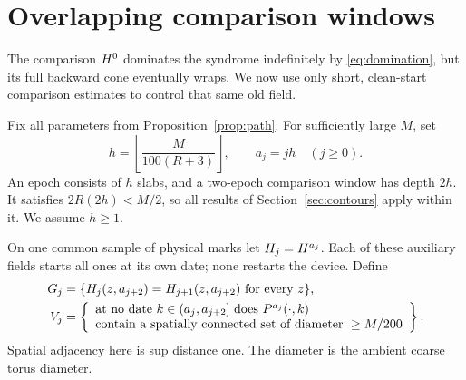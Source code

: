 \section{Overlapping comparison windows}\label{sec:windows}

The comparison \(H^0\) dominates the syndrome indefinitely by
\eqref{eq:domination}, but its full backward cone eventually wraps.
We now use only short, clean-start comparison estimates to control
that same old field.

Fix all parameters from Proposition~\ref{prop:path}. For sufficiently
large \(M\), set
\begin{equation}\label{eq:epoch}
 h=\left\lfloor\frac{M}{100(R+3)}\right\rfloor,\qquad
 a_j=jh\quad(j\ge0).
\end{equation}
An epoch consists of \(h\) slabs, and a two-epoch comparison window
has depth \(2h\). It satisfies \(2R(2h)<M/2\), so all results of
Section~\ref{sec:contours} apply within it. We assume \(h\ge1\).

On one common sample of physical marks let
\(H_j=H^{a_j}\). Each of these auxiliary fields starts all
ones at its own date; none restarts the device. Define
\begin{align}
 G_j&=\{H_j(z,a_{j+2})=H_{j+1}(z,a_{j+2})
                       \text{ for every }z\},\label{eq:G}\\
 V_j&=\left\{\begin{array}{l}
 \text{at no date }k\in(a_j,a_{j+2}]
 \text{ does }P^{a_j}(\cdot,k)\\
 \text{contain a spatially connected set of diameter }\ge M/200
 \end{array}\right\}.\label{eq:V}
\end{align}
Spatial adjacency here is sup distance one. The diameter is the
ambient coarse torus diameter.

